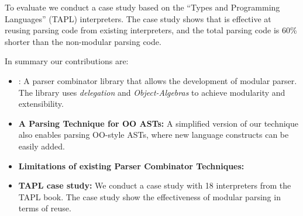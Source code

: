   To evaluate \name we conduct a case study based on the ``Types and
  Programming Languages'' (TAPL) interpreters.  The case study shows
  that \name is effective at reusing parsing code from existing
  interpreters, and the total parsing code is 60\% shorter than the
  non-modular parsing code.

In summary our contributions are:

\begin{itemize}

\item {\name:} A parser combinator library that allows the development 
of modular parser. The library uses \emph{delegation} and
\emph{Object-Algebras} to achieve modularity and extensibility.

\item {{\bf A Parsing Technique for OO ASTs:}} A simplified version of
  our technique also enables parsing OO-style ASTs, where new language
  constructs can be easily added.

\item {{\bf Limitations of existing Parser Combinator Techniques:}}

\item {{\bf TAPL case study:}} We conduct a case study with 18 interpreters
  from the TAPL book. The case study show the effectiveness of modular 
  parsing in terms of reuse.

\end{itemize}